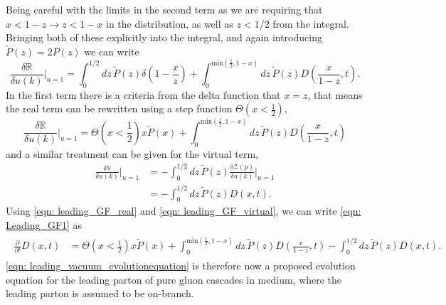 \documentclass[main.tex]{subfiles}
\begin{document}
Being careful with the limits in the second term as we are requiring that \(x<1-z \rightarrow z<1-x\) in the distribution, as well as \(z<1/2\) from the integral. Bringing both of these explicitly into the integral, and again introducing \(\tilde{P}(z) = 2 P(z)\) we can write
\begin{equation}
    \frac{\delta \mathbb{R}}{\delta u(k)}|_{u=1} = \int_0^{1/2} dz \, \tilde{P}(z) \delta(1-\frac{x}{z}) + \int_0^{\text{min}(\frac{1}{2}, 1-x)} dz \, \tilde{P}(z) D(\frac{x}{1-z},t).
\end{equation}
In the first term there is a criteria from the delta function that \(x=z\), that means the real term can be rewritten using a step function \( \Theta(x<\frac{1}{2})\),
\begin{equation}\label{eqn: leading_GF_real}
    \frac{\delta \mathbb{R}}{\delta u(k)}|_{u=1} = \Theta(x<\frac{1}{2})x \tilde{P}(x) + \int_0^{\text{min}(\frac{1}{2}, 1-x)} dz \, \tilde{P}(z) D(\frac{x}{1-z},t)
\end{equation}
and a similar treatment can be given for the virtual term, 
\begin{align}\label{eqn: leading_GF_virtual}
    \frac{\delta \mathbb{V}}{\delta u(k)}|_{u=1} &= -\int_0^{1/2}dz\, \tilde{P}(z) \frac{\delta \mathcal{Z}(p)}{\delta u(k)}|_{u=1} \nonumber \\
    &= -\int_0^{1/2}dz\, \tilde{P}(z) D(x,t).
\end{align}
Using \autoref{eqn: leading_GF_real} and \autoref{eqn: leading_GF_virtual}, we can write \autoref{eqn: Leading_GF1} as
\begin{align}\label{eqn: leading_vacuum_evolutionequation}
    \begin{split}
    \frac{\partial}{\partial t} D(x,t) &= \Theta(x<\frac{1}{2})x \tilde{P}(x) + \int_0^{\text{min}(\frac{1}{2}, 1-x)} dz \, \tilde{P}(z) D(\frac{x}{1-z},t) -\int_0^{1/2}dz\, \tilde{P}(z) D(x,t).
    \end{split}
\end{align}
\autoref{eqn: leading_vacuum_evolutionequation} is therefore now a proposed evolution equation for the leading parton of pure gluon cascades in medium, where the leading parton is assumed to be on-branch.
\end{document}
